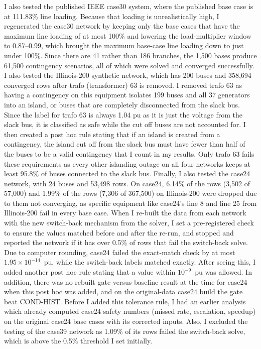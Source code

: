 \documentclass[12pt]{article}
\begin{document}
I also tested the published IEEE case30 system, where the published base case is at 111.83\% line loading. Because that loading is unrealistically high, I regenerated the case30 network by keeping only the base cases that have the maximum line loading of at most 100\% and lowering the load-multiplier window to 0.87--0.99, which brought the maximum base-case line loading down to just under 100\%. Since there are 41 rather than 186 branches, the 1{,}500 bases produce 61{,}500 contingency scenarios, all of which were solved and converged successfully. I also tested the Illinois-200 synthetic network, which has 200 buses and 358,694 converged rows after trafo (transformer) 63 is removed. I removed trafo 63 as having a contingency on this equipment isolates 199 buses and all 37 generators into an island, or buses that are completely disconnected from the slack bus. Since the label for trafo 63 is always 1.04 pu as it is just the voltage from the slack bus, it is classified as safe while the cut off buses are not accounted for. I then created a post hoc rule stating that if an island is created from a contingency, the island cut off from the slack bus must have fewer than half of the buses to be a valid contingency that I count in my results. Only trafo 63 fails these requirements as every other islanding outage on all four networks keeps at least 95.8\% of buses connected to the slack bus. Finally, I also tested the case24 network, with 24 buses and 53,498 rows. On case24, 6.14\% of the rows (3,502 of 57,000) and 1.99\% of the rows (7,306 of 367,500) on Illinois-200 were dropped due to them not converging, as specific equipment like case24's line 8 and line 25 from Illinois-200 fail in every base case. When I re-built the data from each network with the new switch-back mechanism from the solver, I set a pre-registered check to ensure the values matched before and after the re-run, and stopped and reported the network if it has over 0.5\% of rows that fail the switch-back solve. Due to computer rounding, case24 failed the exact-match check by at most $1.95\times10^{-14}$~pu, while the switch-back labels matched exactly. After seeing this, I added another post hoc rule stating that a value within $10^{-9}$~pu was allowed. In addition, there was no rebuilt gate versus baseline result at the time for case24 when this post hoc was added, and on the original-data case24 build the gate beat COND-HIST. Before I added this tolerance rule, I had an earlier analysis which already computed case24 safety numbers (missed rate, escalation, speedup) on the original case24 base cases with its corrected inputs. Also, I excluded the testing of the case39 network as 1.09\% of its rows failed the switch-back solve, which is above the 0.5\% threshold I set initially.
\end{document}
